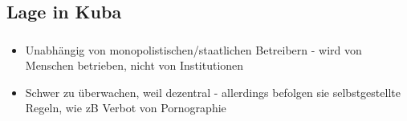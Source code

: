 \subsection{Lage in Kuba}

\begin{frame}
\frametitle{}
	\begin{itemize}
		\item Unabhängig von monopolistischen/staatlichen Betreibern - wird von Menschen betrieben, nicht von Institutionen
		\item Schwer zu überwachen, weil dezentral - allerdings befolgen sie selbstgestellte Regeln, wie zB Verbot von Pornographie
	\end{itemize}
\end{frame}
